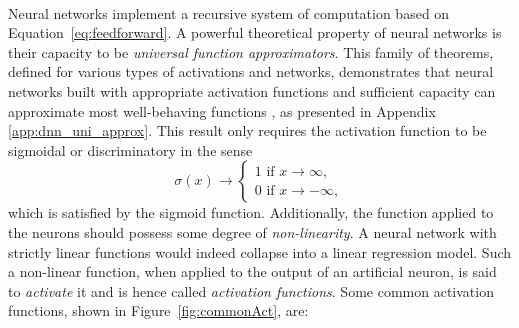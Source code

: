 \paragraph{}Neural networks implement a recursive system of computation based on Equation~\ref{eq:feedforward}. A powerful theoretical property of neural networks is their capacity to be \textit{universal function approximators}. This family of theorems, defined for various types of activations and networks, demonstrates that neural networks built with appropriate activation functions and sufficient capacity can approximate most well-behaving functions \cite{universalFuncApproxNN,HORNIK1989359, universApproximator-Relu}, as presented in Appendix \ref{app:dnn_uni_approx}. This result only requires the activation function to be sigmoidal or discriminatory in the sense
\begin{equation}
    \sigma(x) \rightarrow
    \begin{cases}
        1 \text{ if } x \rightarrow \infty,  \\
        0 \text{ if } x \rightarrow -\infty,
    \end{cases}
\end{equation}
which is satisfied by the sigmoid function. Additionally, the function applied to the neurons should possess some degree of \textit{non-linearity}. A neural network with strictly linear functions would indeed collapse into a linear regression model. Such a non-linear function, when applied to the output of an artificial neuron, is said to \textit{activate} it and is hence called \textit{activation functions}. Some common activation functions, shown in Figure~\ref{fig:commonAct}, are:
